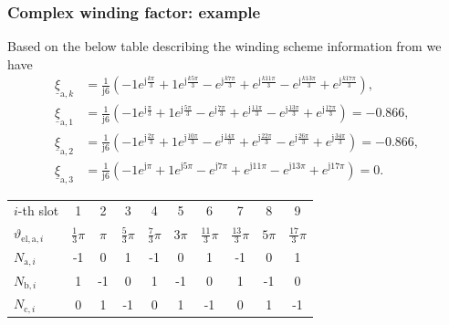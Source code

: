 \begin{frame}
	\frametitle{Complex winding factor: example}
    Based on the below table describing the winding scheme information from  we have
    \begin{align*}
        \underline{\xi}_{\mathrm{a},k} &= \frac{1}{\mathrm{j}6}\left(-1e^{\mathrm{j}\frac{k\pi}{3}} + 1 e^{\mathrm{j}\frac{k5\pi}{3}}-e^{\mathrm{j}\frac{k7\pi}{3}} + e^{\mathrm{j}\frac{k11\pi}{3}} - e^{\mathrm{j}\frac{k13\pi}{3}}+e^{\mathrm{j}\frac{k17\pi}{3}}\right),\\
        \underline{\xi}_{\mathrm{a},1} &= \frac{1}{\mathrm{j}6}\left(-1e^{\mathrm{j}\frac{\pi}{3}} + 1 e^{\mathrm{j}\frac{5\pi}{3}}-e^{\mathrm{j}\frac{7\pi}{3}} + e^{\mathrm{j}\frac{11\pi}{3}} - e^{\mathrm{j}\frac{13\pi}{3}}+e^{\mathrm{j}\frac{17\pi}{3}}\right) = -0.866,\\
        \underline{\xi}_{\mathrm{a},2} &= \frac{1}{\mathrm{j}6}\left(-1e^{\mathrm{j}\frac{2\pi}{3}} + 1 e^{\mathrm{j}\frac{10\pi}{3}}-e^{\mathrm{j}\frac{14\pi}{3}} + e^{\mathrm{j}\frac{22\pi}{3}} - e^{\mathrm{j}\frac{26\pi}{3}}+e^{\mathrm{j}\frac{34\pi}{3}}\right) = -0.866,\\
        \underline{\xi}_{\mathrm{a},3} &= \frac{1}{\mathrm{j}6}\left(-1e^{\mathrm{j}\pi} + 1 e^{\mathrm{j}5\pi}-e^{\mathrm{j}7\pi} + e^{\mathrm{j}11\pi} - e^{\mathrm{j}13\pi}+e^{\mathrm{j}17\pi}\right) = 0.
    \end{align*}
    \vspace{-0.35cm}
    \begin{table}
        \centering
        \begin{tabular}{l c c c c c c c c c}
            \toprule
           $i$-th slot & 1 & 2 & 3 & 4 & 5 & 6 & 7 & 8 & 9 \\ 
           $\vartheta_{\mathrm{el},\mathrm{a},i}$ & $\frac{1}{3}\pi$ & $\pi$ & $\frac{5}{3}\pi$ & $\frac{7}{3}\pi$ & $3\pi$ & $\frac{11}{3}\pi$ & $\frac{13}{3}\pi$ & $5\pi$ & $\frac{17}{3}\pi$\\ 
           \midrule
              $N_{\mathrm{a},i}$ & -1 & 0 & 1 & -1 & 0 & 1 & -1 & 0 & 1\\
              $N_{\mathrm{b},i}$ & 1 & -1 & 0 & 1 & -1 & 0 & 1 & -1 & 0\\
                $N_{\mathrm{c},i}$ & 0 & 1 & -1 & 0 & 1 & -1 & 0 & 1 & -1\\
            \bottomrule
        \end{tabular}
    \end{table}
\end{frame}